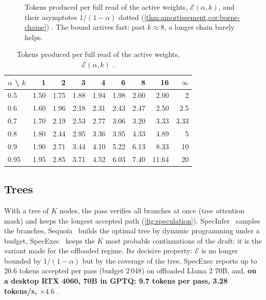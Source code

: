 \begin{figure}[ht]
\centering
\GrapheAmortissement
\caption[Tokens produced per read of the weights, $\mathcal E(\alpha,k)$]{Tokens produced per full read of the active weights, $\mathcal E(\alpha, k)$, and their asymptotes $1/(1-\alpha)$ dotted (\cref{thm:amortissement,cor:borne-chaine}) \calc. The bound arrives fast: past $k \approx 8$, a longer chain barely helps.}
\label{fig:amortissement}
\end{figure}

\begin{table}[ht]
\centering\small
\caption[Values of $\mathcal E(\alpha,k)$]{Tokens produced per full read of the active weights, $\mathcal E(\alpha,k)$ \calc.}
\label{tab:amortissement}
\begin{tabular}{@{}lrrrrrrrr@{}}
\toprule
$\alpha$ \textbackslash{} $k$ & 1 & 2 & 3 & 4 & 6 & 8 & 16 & $\infty$ \\
\midrule
0.5 & 1.50 & 1.75 & 1.88 & 1.94 & 1.98 & 2.00 & 2.00 & 2 \\
0.6 & 1.60 & 1.96 & 2.18 & 2.31 & 2.43 & 2.47 & 2.50 & 2.5 \\
0.7 & 1.70 & 2.19 & 2.53 & 2.77 & 3.06 & 3.20 & 3.33 & 3.33 \\
0.8 & 1.80 & 2.44 & 2.95 & 3.36 & 3.95 & 4.33 & 4.89 & 5 \\
0.9 & 1.90 & 2.71 & 3.44 & 4.10 & 5.22 & 6.13 & 8.33 & 10 \\
0.95 & 1.95 & 2.85 & 3.71 & 4.52 & 6.03 & 7.40 & 11.64 & 20 \\
\bottomrule
\end{tabular}
\end{table}

\subsection{Trees}

With a tree of $K$ nodes, the pass verifies all branches at once (tree attention mask) and keeps the longest accepted path (\cref{fig:speculation}). SpecInfer~\cite{specinfer2023} samples the branches, Sequoia~\cite{sequoia2024} builds the optimal tree by dynamic programming under a budget, SpecExec~\cite{specexec2024} keeps the $K$ most probable continuations of the draft: it is the variant made for the offloaded regime. Its decisive property: $\mathcal E$ is no longer bounded by $1/(1-\alpha)$ but by the coverage of the tree. SpecExec reports up to 20.6 tokens accepted per pass (budget 2\,048) on offloaded Llama 2 70B, and, \textbf{on a desktop RTX 4060, 70B in GPTQ: 9.7 tokens per pass, 3.28 tokens/s, $\times 4.6$} \litt.

